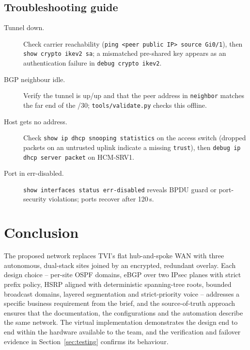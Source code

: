 \documentclass[11pt,a4paper]{article}
\newcounter{evid}
\begin{document}
\subsection{Troubleshooting guide}
\begin{description}
\item[Tunnel down.] Check carrier reachability (\texttt{ping <peer public IP> source Gi0/1}), then \texttt{show crypto ikev2 sa}; a mismatched pre-shared key appears as an authentication failure in \texttt{debug crypto ikev2}.
\item[BGP neighbour idle.] Verify the tunnel is up/up and that the peer address in \texttt{neighbor} matches the far end of the /30; \texttt{tools/validate.py} checks this offline.
\item[Host gets no address.] Check \texttt{show ip dhcp snooping statistics} on the access switch (dropped packets on an untrusted uplink indicate a missing \texttt{trust}), then \texttt{debug ip dhcp server packet} on HCM-SRV1.
\item[Port in err-disabled.] \texttt{show interfaces status err-disabled} reveals BPDU guard or port-security violations; ports recover after 120\,s.
\end{description}

\section{Conclusion}

The proposed network replaces TVI's flat hub-and-spoke WAN with three autonomous, dual-stack sites joined by an encrypted, redundant overlay. Each design choice -- per-site OSPF domains, eBGP over two IPsec planes with strict prefix policy, HSRP aligned with deterministic spanning-tree roots, bounded broadcast domains, layered segmentation and strict-priority voice -- addresses a specific business requirement from the brief, and the source-of-truth approach ensures that the documentation, the configurations and the automation describe the same network. The virtual implementation demonstrates the design end to end within the hardware available to the team, and the verification and failover evidence in Section~\ref{sec:testing} confirms its behaviour.
\end{document}

